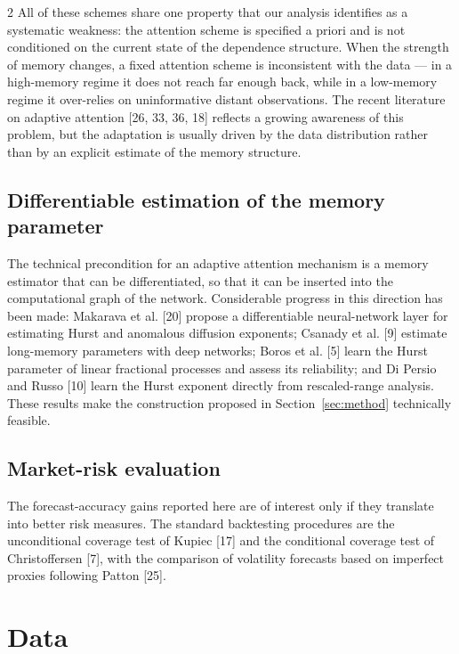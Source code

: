 \documentclass[a4paper,10pt,twoside]{article}
\begin{document}
\begin{multicols}{2}
All of these schemes share one property that our analysis identifies as a systematic weakness:
the attention scheme is specified a priori and is not conditioned on the current state of the
dependence structure. When the strength of memory changes, a fixed attention scheme is inconsistent
with the data --- in a high-memory regime it does not reach far enough back, while in a low-memory
regime it over-relies on uninformative distant observations. The recent literature on adaptive
attention [26, 33, 36, 18] reflects a
growing awareness of this problem, but the adaptation is usually driven by the data distribution
rather than by an explicit estimate of the memory structure.

\subsection{Differentiable estimation of the memory parameter}

The technical precondition for an adaptive attention mechanism is a memory estimator that can be
differentiated, so that it can be inserted into the computational graph of the network. Considerable
progress in this direction has been made: Makarava et al. [20] propose
a differentiable neural-network layer for estimating Hurst and anomalous diffusion exponents;
Csanady et al. [9] estimate long-memory parameters with deep networks;
Boros et al. [5] learn the Hurst parameter of linear fractional processes and
assess its reliability; and Di Persio and Russo [10] learn the Hurst exponent
directly from rescaled-range analysis. These results make the construction proposed in
Section~\ref{sec:method} technically feasible.

\subsection{Market-risk evaluation}

The forecast-accuracy gains reported here are of interest only if they translate into better risk
measures. The standard backtesting procedures are the unconditional coverage test of Kupiec
[17] and the conditional coverage test of Christoffersen
[7], with the comparison of volatility forecasts based on imperfect
proxies following Patton [25].


\section{Data}\label{sec:data}


\end{multicols}
\end{document}
